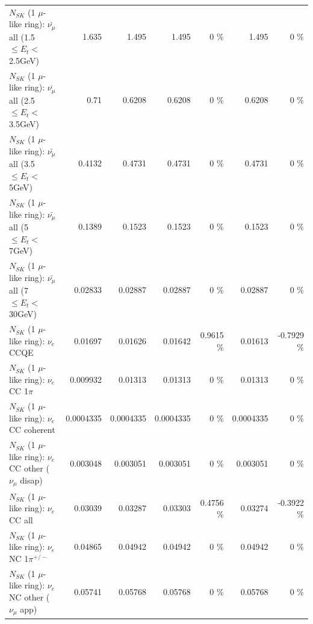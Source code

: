 \begin{table}
\begin{tabular}{| l | r | r | r  r | r  r |}
 $N_{SK}$ (1 $\mu$-like ring): $\bar{\nu_{\mu}}$ all (1.5 $\leq E_{t} <$ 2.5GeV) &           1.635 &           1.495 &           1.495 &        0 \%  &           1.495 &        0 \%  \\ 
 $N_{SK}$ (1 $\mu$-like ring): $\bar{\nu_{\mu}}$ all (2.5 $\leq E_{t} <$ 3.5GeV) &            0.71 &          0.6208 &          0.6208 &        0 \%  &          0.6208 &        0 \%  \\ 
   $N_{SK}$ (1 $\mu$-like ring): $\bar{\nu_{\mu}}$ all (3.5 $\leq E_{t} <$ 5GeV) &          0.4132 &          0.4731 &          0.4731 &        0 \%  &          0.4731 &        0 \%  \\ 
     $N_{SK}$ (1 $\mu$-like ring): $\bar{\nu_{\mu}}$ all (5 $\leq E_{t} <$ 7GeV) &          0.1389 &          0.1523 &          0.1523 &        0 \%  &          0.1523 &        0 \%  \\ 
    $N_{SK}$ (1 $\mu$-like ring): $\bar{\nu_{\mu}}$ all (7 $\leq E_{t} <$ 30GeV) &         0.02833 &         0.02887 &         0.02887 &        0 \%  &         0.02887 &        0 \%  \\ 
\hline
\hline
\hline
                                      $N_{SK}$ (1 $\mu$-like ring): $\nu_e$ CCQE &         0.01697 &         0.01626 &         0.01642 &   0.9615 \%  &         0.01613 &  -0.7929 \%  \\ 
                                 $N_{SK}$ (1 $\mu$-like ring): $\nu_e$ CC 1$\pi$ &        0.009932 &         0.01313 &         0.01313 &        0 \%  &         0.01313 &        0 \%  \\ 
                               $N_{SK}$ (1 $\mu$-like ring): $\nu_e$ CC coherent &       0.0004335 &       0.0004335 &       0.0004335 &        0 \%  &       0.0004335 &        0 \%  \\ 
                $N_{SK}$ (1 $\mu$-like ring): $\nu_e$ CC other ($\nu_\mu$ disap) &        0.003048 &        0.003051 &        0.003051 &        0 \%  &        0.003051 &        0 \%  \\ 
                                  $N_{SK}$ (1 $\mu$-like ring): $\nu_{e}$ CC all &         0.03039 &         0.03287 &         0.03303 &   0.4756 \%  &         0.03274 &  -0.3922 \%  \\ 
\hline
                           $N_{SK}$ (1 $\mu$-like ring): $\nu_e$ NC 1$\pi^{+/-}$ &         0.04865 &         0.04942 &         0.04942 &        0 \%  &         0.04942 &        0 \%  \\ 
                  $N_{SK}$ (1 $\mu$-like ring): $\nu_e$ NC other ($\nu_\mu$ app) &         0.05741 &         0.05768 &         0.05768 &        0 \%  &         0.05768 &        0 \%  \\ 

\end{tabular}
\end{table}
